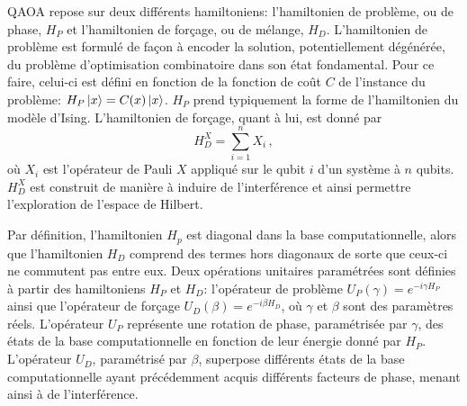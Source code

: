 QAOA repose sur deux différents hamiltoniens: l'hamiltonien de problème, ou de phase, $H_{P}$ et l'hamiltonien de forçage, ou de mélange, $H_{D}$. L'hamiltonien de problème est formulé de façon à encoder la solution, potentiellement dégénérée, du problème d'optimisation combinatoire dans son état fondamental. Pour ce faire, celui-ci est défini en fonction de la fonction de coût $C$ de l'instance du problème: $H_{P}\ket{x} = C(x)\ket{x}$. $H_{P}$ prend typiquement la forme de l'hamiltonien du modèle d'Ising. L'hamiltonien de forçage, quant à lui, est donné par
\begin{equation}
    \label{eq:x-drive}
    H_{D}^{X} = \sum_{i=1}^{n} X_{i} \,,
\end{equation}
où $X_{i}$ est l'opérateur de Pauli $X$ appliqué sur le qubit $i$ d'un système à $n$ qubits. $H_{D}^{X}$ est construit de manière à induire de l'interférence et ainsi permettre l'exploration de l'espace de Hilbert. 

Par définition, l'hamiltonien $H_{p}$ est diagonal dans la base computationnelle, alors que l'hamiltonien $H_{D}$ comprend des termes hors diagonaux de sorte que ceux-ci ne commutent pas entre eux. Deux opérations unitaires paramétrées sont définies à partir des hamiltoniens $H_{P}$ et $H_{D}$: l'opérateur de problème $U_{P}(\gamma) = e^{-i \gamma H_{P}}$ ainsi que l'opérateur de forçage $U_{D}(\beta) = e^{-i \beta H_{D}}$, où $\gamma$ et $\beta$ sont des paramètres réels. L'opérateur $U_{P}$ représente une rotation de phase, paramétrisée par $\gamma$, des états de la base computationnelle en fonction de leur énergie donné par $H_{P}$. L'opérateur $U_{D}$, paramétrisé par $\beta$, superpose différents états de la base computationnelle ayant précédemment acquis différents facteurs de phase, menant ainsi à de l'interférence.

